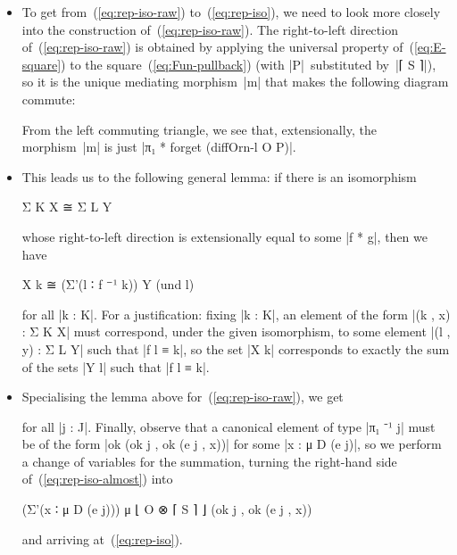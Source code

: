 \begin{itemize}
\item To get from~(\ref{eq:rep-iso-raw}) to~(\ref{eq:rep-iso}), we need to look more closely into the construction of~(\ref{eq:rep-iso-raw}).
The right-to-left direction of~(\ref{eq:rep-iso-raw}) is obtained by applying the universal property of~(\ref{eq:E-square}) to the square~(\ref{eq:Fun-pullback}) (with |P|~substituted by~|⌈ S ⌉|), so it is the unique mediating morphism~|m| that makes the following diagram commute:
\begin{center}
\end{center}
From the left commuting triangle, we see that, extensionally, the morphism~|m| is just |π₁ * forget (diffOrn-l O P)|.

\item This leads us to the following general lemma:
if there is an isomorphism
\begin{code}
Σ K X ≅ Σ L Y
\end{code}
whose right-to-left direction is extensionally equal to some |f * g|, then we have
\begin{code}
X k ≅ (Σ'(l ∶ f ⁻¹ k)) Y (und l)
\end{code}
for all |k : K|.
For a justification: fixing |k : K|, an element of the form |(k , x) : Σ K X| must correspond, under the given isomorphism, to some element |(l , y) : Σ L Y| such that |f l ≡ k|, so the set |X k| corresponds to exactly the sum of the sets |Y l| such that |f l ≡ k|.

\item Specialising the lemma above for~(\ref{eq:rep-iso-raw}), we get
for all |j : J|.
Finally, observe that a canonical element of type |π₁ ⁻¹ j| must be of the form |ok (ok j , ok (e j , x))| for some |x : μ D (e j)|, so we perform a change of variables for the summation, turning the right-hand side of~(\ref{eq:rep-iso-almost}) into
\begin{code}
(Σ'(x ∶ μ D (e j))) μ ⌊ O ⊗ ⌈ S ⌉ ⌋ (ok j , ok (e j , x))
\end{code}
and arriving at~(\ref{eq:rep-iso}).

\end{itemize}

